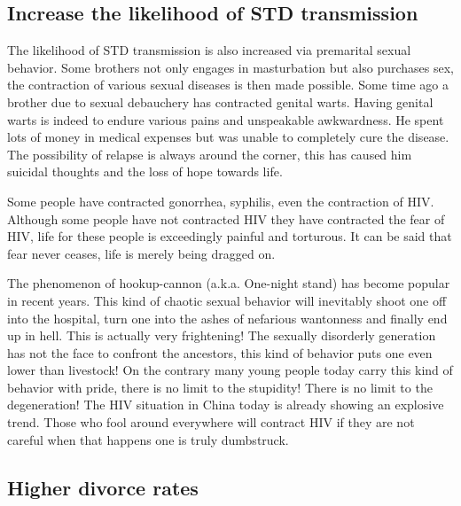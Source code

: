 \documentclass[
]{book}
\begin{document}
\hypertarget{increase-the-likelihood-of-std-transmission}{%
\subsection{Increase the likelihood of STD transmission}\label{increase-the-likelihood-of-std-transmission}}

The likelihood of STD transmission is also increased via premarital sexual behavior. Some brothers not only engages in masturbation but also purchases sex, the contraction of various sexual diseases is then made possible. Some time ago a brother due to sexual debauchery has contracted genital warts. Having genital warts is indeed to endure various pains and unspeakable awkwardness. He spent lots of money in medical expenses but was unable to completely cure the disease. The possibility of relapse is always around the corner, this has caused him suicidal thoughts and the loss of hope towards life.

Some people have contracted gonorrhea, syphilis, even the contraction of HIV. Although some people have not contracted HIV they have contracted the fear of HIV, life for these people is exceedingly painful and torturous. It can be said that fear never ceases, life is merely being dragged on.

The phenomenon of hookup-cannon (a.k.a. One-night stand) has become popular in recent years. This kind of chaotic sexual behavior will inevitably shoot one off into the hospital, turn one into the ashes of nefarious wantonness and finally end up in hell. This is actually very frightening! The sexually disorderly generation has not the face to confront the ancestors, this kind of behavior puts one even lower than livestock! On the contrary many young people today carry this kind of behavior with pride, there is no limit to the stupidity! There is no limit to the degeneration! The HIV situation in China today is already showing an explosive trend. Those who fool around everywhere will contract HIV if they are not careful when that happens one is truly dumbstruck.

\hypertarget{higher-divorce-rates}{%
\subsection{Higher divorce rates}\label{higher-divorce-rates}}
\end{document}
